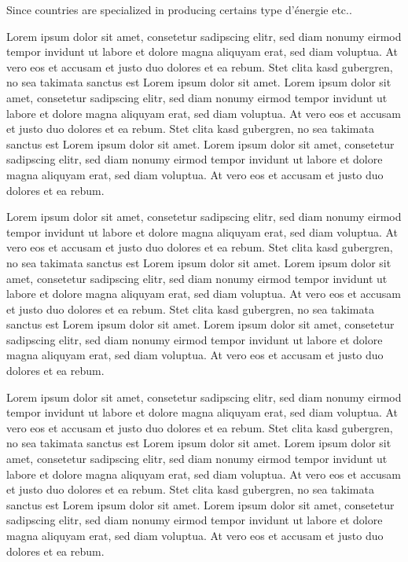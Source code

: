 \documentclass[preprint,journal]{vgtc}       %
\begin{document}
		Since countries are specialized in producing certains type d'énergie etc.. 
	
Lorem ipsum dolor sit amet, consetetur sadipscing elitr, sed diam
nonumy eirmod tempor invidunt ut labore et dolore magna aliquyam erat,
sed diam voluptua. At vero eos et accusam et justo duo dolores et ea
rebum. Stet clita kasd gubergren, no sea takimata sanctus est Lorem
ipsum dolor sit amet. Lorem ipsum dolor sit amet, consetetur
sadipscing elitr, sed diam nonumy eirmod tempor invidunt ut labore et
dolore magna aliquyam erat, sed diam voluptua. At vero eos et accusam
et justo duo dolores et ea rebum. Stet clita kasd gubergren, no sea
takimata sanctus est Lorem ipsum dolor sit amet. Lorem ipsum dolor sit
amet, consetetur sadipscing elitr, sed diam nonumy eirmod tempor
invidunt ut labore et dolore magna aliquyam erat, sed diam
voluptua. At vero eos et accusam et justo duo dolores et ea
rebum.

Lorem ipsum dolor sit amet, consetetur sadipscing elitr, sed diam
nonumy eirmod tempor invidunt ut labore et dolore magna aliquyam erat,
sed diam voluptua. At vero eos et accusam et justo duo dolores et ea
rebum. Stet clita kasd gubergren, no sea takimata sanctus est Lorem
ipsum dolor sit amet. Lorem ipsum dolor sit amet, consetetur
sadipscing elitr, sed diam nonumy eirmod tempor invidunt ut labore et
dolore magna aliquyam erat, sed diam voluptua. At vero eos et accusam
et justo duo dolores et ea rebum. Stet clita kasd gubergren, no sea
takimata sanctus est Lorem ipsum dolor sit amet. Lorem ipsum dolor sit
amet, consetetur sadipscing elitr, sed diam nonumy eirmod tempor
invidunt ut labore et dolore magna aliquyam erat, sed diam
voluptua. At vero eos et accusam et justo duo dolores et ea
rebum.

Lorem ipsum dolor sit amet, consetetur sadipscing elitr, sed diam
nonumy eirmod tempor invidunt ut labore et dolore magna aliquyam erat,
sed diam voluptua. At vero eos et accusam et justo duo dolores et ea
rebum. Stet clita kasd gubergren, no sea takimata sanctus est Lorem
ipsum dolor sit amet. Lorem ipsum dolor sit amet, consetetur
sadipscing elitr, sed diam nonumy eirmod tempor invidunt ut labore et
dolore magna aliquyam erat, sed diam voluptua. At vero eos et accusam
et justo duo dolores et ea rebum. Stet clita kasd gubergren, no sea
takimata sanctus est Lorem ipsum dolor sit amet. Lorem ipsum dolor sit
amet, consetetur sadipscing elitr, sed diam nonumy eirmod tempor
invidunt ut labore et dolore magna aliquyam erat, sed diam
voluptua. At vero eos et accusam et justo duo dolores et ea
rebum.
\end{document}
